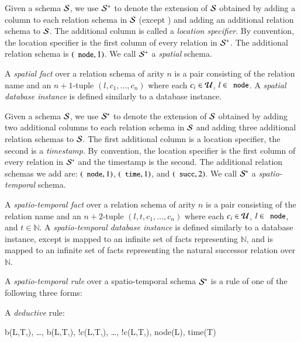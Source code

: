 Given a schema $\schema$, we use $\sschema$ to denote the extension of $\schema$
obtained by adding a column to each relation schema in $\schema$ (except
\dedalus{<}) and adding an additional relation schema to $\schema$.  The
additional column is called a {\em location specifier}.  By convention, the
location specifier is the first column of every relation in $\sschema$.  The
additional relation schema is $(\dedalus{node},1)$.  We call $\sschema$ a {\em
  spatial} schema.

A {\em spatial fact} over a relation schema of arity $n$ is a pair consisting of the relation name and an $n+1$-tuple $(l,c_1,\ldots,c_n)$ where each $c_i \in \univ$, $l \in \dedalus{node}$.  A {\em spatial database instance} is defined similarly to a database instance.

Given a schema $\schema$, we use $\stschema$ to denote the extension of
$\schema$ obtained by adding two additional columns to each relation schema in $\schema$ and adding three additional relation schemas to $\schema$. 
The first additional column is a location specifier, the second is a {\em timestamp}.  By convention, the location specifier is the first column of every relation in $\stschema$ and the timestamp is the second.  
The additional relation schemas we add are: $(\dedalus{node},1)$,
$(\dedalus{time},1)$, and $(\dedalus{succ},2)$.
We call $\stschema$ a {\em spatio-temporal} schema.

A {\em spatio-temporal fact} over a relation schema of arity $n$ is a pair consisting of the relation name and an $n+2$-tuple $(l,t,c_1,\ldots,c_n)$ where each $c_i \in \univ$, $l \in \dedalus{node}$, and $t \in \mathbb{N}$.  A {\em spatio-temporal database instance} is defined similarly to a database instance, except  is mapped to an infinite set of  facts representing $\mathbb{N}$, and  is mapped to an infinite set of  facts representing the natural successor relation over $\mathbb{N}$.

A {\em spatio-temporal rule} over a spatio-temporal schema $\stschema$ is a rule of one of the following three forms:

A {\em deductive} rule:

\begin{Drules}
        {b(L,T,), \ldots, b(L,T,), !c(L,T,), \ldots, !c(L,T,), node(L), time(T)}
\end{Drules}

